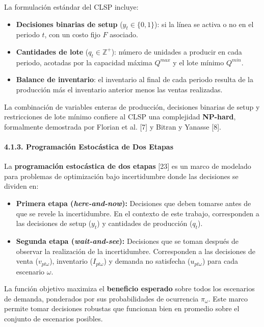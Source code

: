 \documentclass[
  spanish,
  12pt,
]{article}
\providecommand{\tightlist}{%
  \setlength{\itemsep}{0pt}\setlength{\parskip}{0pt}}
\begin{document}
La formulación estándar del CLSP incluye:

\begin{itemize}
\tightlist
\item
  \textbf{Decisiones binarias de setup} (\(y_t \in \{0,1\}\)): si la
  línea se activa o no en el periodo \(t\), con un costo fijo \(F\)
  asociado.
\item
  \textbf{Cantidades de lote} (\(q_t \in \mathbb{Z}^+\)): número de
  unidades a producir en cada periodo, acotadas por la capacidad máxima
  \(Q^{max}\) y el lote mínimo \(Q^{min}\).
\item
  \textbf{Balance de inventario}: el inventario al final de cada periodo
  resulta de la producción más el inventario anterior menos las ventas
  realizadas.
\end{itemize}

La combinación de variables enteras de producción, decisiones binarias
de setup y restricciones de lote mínimo confiere al CLSP una complejidad
\textbf{NP-hard}, formalmente demostrada por Florian et al. {[}7{]} y
Bitran y Yanasse {[}8{]}.

\paragraph{4.1.3. Programación Estocástica de Dos
Etapas}\label{programaciuxf3n-estocuxe1stica-de-dos-etapas}

La \textbf{programación estocástica de dos etapas} {[}23{]} es un marco
de modelado para problemas de optimización bajo incertidumbre donde las
decisiones se dividen en:

\begin{itemize}
\tightlist
\item
  \textbf{Primera etapa (\emph{here-and-now}):} Decisiones que deben
  tomarse antes de que se revele la incertidumbre. En el contexto de
  este trabajo, corresponden a las decisiones de setup (\(y_t\)) y
  cantidades de producción (\(q_t\)).
\item
  \textbf{Segunda etapa (\emph{wait-and-see}):} Decisiones que se toman
  después de observar la realización de la incertidumbre. Corresponden a
  las decisiones de venta (\(v_{pt\omega}\)), inventario
  (\(I_{pt\omega}\)) y demanda no satisfecha (\(u_{pt\omega}\)) para
  cada escenario \(\omega\).
\end{itemize}

La función objetivo maximiza el \textbf{beneficio esperado} sobre todos
los escenarios de demanda, ponderados por sus probabilidades de
ocurrencia \(\pi_\omega\). Este marco permite tomar decisiones robustas
que funcionan bien en promedio sobre el conjunto de escenarios posibles.
\end{document}
